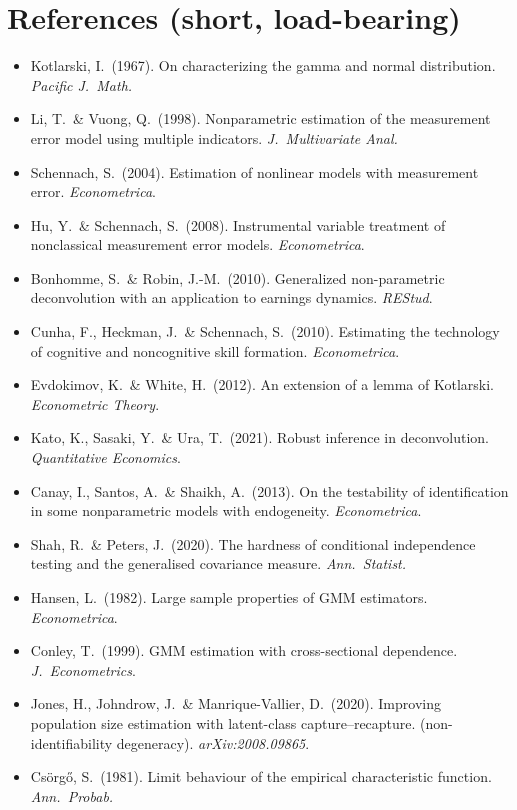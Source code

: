 \documentclass[11pt]{article}
\theoremstyle{definition}
\begin{document}
\section*{References (short, load-bearing)}
\small
\begin{itemize}[leftmargin=1.2em,itemsep=1pt]
\item Kotlarski, I.\ (1967). On characterizing the gamma and normal
distribution. \emph{Pacific J.\ Math.}
\item Li, T.\ \& Vuong, Q.\ (1998). Nonparametric estimation of the measurement
error model using multiple indicators. \emph{J.\ Multivariate Anal.}
\item Schennach, S.\ (2004). Estimation of nonlinear models with measurement
error. \emph{Econometrica}.
\item Hu, Y.\ \& Schennach, S.\ (2008). Instrumental variable treatment of
nonclassical measurement error models. \emph{Econometrica}.
\item Bonhomme, S.\ \& Robin, J.-M.\ (2010). Generalized non-parametric
deconvolution with an application to earnings dynamics. \emph{REStud}.
\item Cunha, F., Heckman, J.\ \& Schennach, S.\ (2010). Estimating the
technology of cognitive and noncognitive skill formation. \emph{Econometrica}.
\item Evdokimov, K.\ \& White, H.\ (2012). An extension of a lemma of
Kotlarski. \emph{Econometric Theory}.
\item Kato, K., Sasaki, Y.\ \& Ura, T.\ (2021). Robust inference in
deconvolution. \emph{Quantitative Economics}.
\item Canay, I., Santos, A.\ \& Shaikh, A.\ (2013). On the testability of
identification in some nonparametric models with endogeneity.
\emph{Econometrica}.
\item Shah, R.\ \& Peters, J.\ (2020). The hardness of conditional independence
testing and the generalised covariance measure. \emph{Ann.\ Statist.}
\item Hansen, L.\ (1982). Large sample properties of GMM estimators.
\emph{Econometrica}.
\item Conley, T.\ (1999). GMM estimation with cross-sectional dependence.
\emph{J.\ Econometrics}.
\item Jones, H., Johndrow, J.\ \& Manrique-Vallier, D.\ (2020). Improving
population size estimation with latent-class capture--recapture.
(non-identifiability degeneracy). \emph{arXiv:2008.09865}.
\item Csörgő, S.\ (1981). Limit behaviour of the empirical characteristic
function. \emph{Ann.\ Probab.}
\end{itemize}
\end{document}
